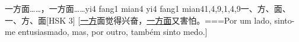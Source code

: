 \begin{EntryWithPhonetic}{一方面……，一方面……}{yi4 fang1 mian4 yi4 fang1 mian4}{1,4,9,1,4,9}{⼀、⽅、⾯、⼀、⽅、⾯}[HSK 3]
  [\underline{一方}面觉得兴奋，\underline{一方面}又害怕。===Por um lado, sinto-me entusiasmado, mas, por outro, também sinto medo.]
\end{EntryWithPhonetic}

